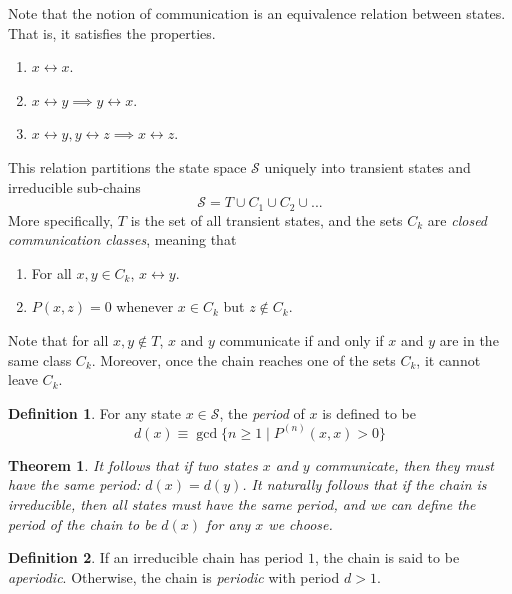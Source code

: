 \documentclass{article}
\newtheorem{theorem}{Theorem}[section]
\theoremstyle{remark}
\theoremstyle{definition}
\newtheorem{definition}{Definition}[section]
\begin{document}
Note that the notion of communication is an equivalence relation between states. That is, it satisfies the properties. 
\begin{enumerate}
    \item $x \leftrightarrow x$.
    \item $x \leftrightarrow y \implies y \leftrightarrow x$.
    \item $x \leftrightarrow y, y \leftrightarrow z \implies x \leftrightarrow z$.
\end{enumerate}
This relation partitions the state space $\mathcal{S}$ uniquely into transient states and irreducible sub-chains
\[\mathcal{S} = T \cup C_1 \cup C_2 \cup ...\]
More specifically, $T$ is the set of all transient states, and the sets $C_k$ are \textit{closed communication classes}, meaning that
\begin{enumerate}
    \item For all $x, y \in C_k$, $x \leftrightarrow y$. 
    \item $P(x, z) = 0$ whenever $x \in C_k$ but $z \not\in C_k$. 
\end{enumerate}
Note that for all $x, y \not\in T$, $x$ and $y$ communicate if and only if $x$ and $y$ are in the same class $C_k$. Moreover, once the chain reaches one of the sets $C_k$, it cannot leave $C_k$. 

\begin{definition}
For any state $x \in \mathcal{S}$, the \textit{period} of $x$ is defined to be
\[d(x) \equiv \gcd \{n \geq 1 \; | \; P^{(n)} (x, x) > 0\}\]
\end{definition}

\begin{theorem}
It follows that if two states $x$ and $y$ communicate, then they must have the same period: $d(x) = d(y)$. It naturally follows that if the chain is irreducible, then all states must have the same period, and we can define the period of the chain to be $d(x)$ for any $x$ we choose.
\end{theorem}

\begin{definition}
If an irreducible chain has period $1$, the chain is said to be \textit{aperiodic}. Otherwise, the chain is \textit{periodic} with period $d > 1$. 
\end{definition}
\end{document}
